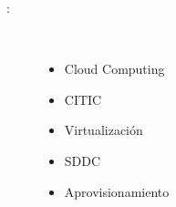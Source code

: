 \begin{description}
\item [\palabraschaveprincipal:] \mbox{} \\[-20pt]
\begin{itemize}
    \item Cloud Computing
    \item CITIC
    \item Virtualización
    \item SDDC
    \item Aprovisionamiento
\end{itemize}
\end{description}
